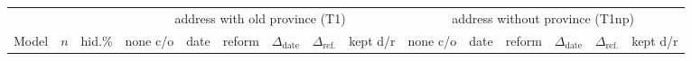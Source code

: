 \begin{tabular}{@{}l r r ccc cc c ccc cc c@{}}
\toprule
 & & & \multicolumn{6}{c}{address with old province (T1)} & \multicolumn{6}{c}{address without province (T1np)} \\
\cmidrule(lr){4-9}\cmidrule(lr){10-15}
Model & $n$ & hid.\% & none c/o & date & reform & $\Delta_{\text{date}}$ & $\Delta_{\text{ref.}}$ & kept d/r & none c/o & date & reform & $\Delta_{\text{date}}$ & $\Delta_{\text{ref.}}$ & kept d/r \\
\midrule
\bottomrule
\end{tabular}
